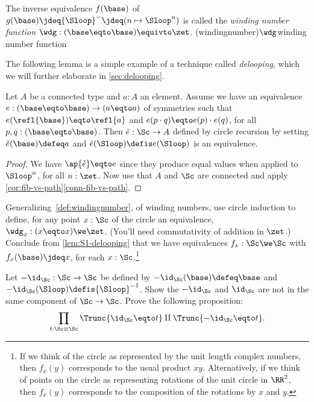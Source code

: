 \begin{definition}\label{def:windingnumber}
The inverse equivalence $f(\base)$ of $g(\base)\jdeq{\Sloop}^{-}
\jdeq(n\mapsto \Sloop^n)$ is called the \emph{winding number function}
  $\wdg : (\base \eqto\base) \equivto \zet$.
  \glossary(windingnumber){$\protect\wdg$}{winding number function}
\end{definition}
The following lemma is a simple example of a technique called
\emph{delooping}, which we will further elaborate in \cref{sec:delooping}.
\begin{lemma}\label{lem:S1-delooping}
Let $A$ be a connected type and $a:A$ an element.
Assume we have an equivalence $e:(\base\eqto\base) \to (a\eqto a)$
of symmetries such that $e(\refl{\base})\eqto\refl{a}$
and $e(p\cdot q)\eqto e(p)\cdot e(q)$, for all $p,q:(\base\eqto\base)$.
Then $\check e : \Sc\to A$ defined by circle recursion by setting
$\check e(\base)\defeq a$ and $\check e(\Sloop)\defis e(\Sloop)$
is an equivalence.
\end{lemma}
\begin{proof}
We have $\ap{\check e}\eqto e$ since they produce equal values when applied
to $\Sloop^n$, for all $n:\zet$. Now use that $A$ and $\Sc$ are connected and
apply \cref{cor:fib-vs-path}\ref{conn-fib-vs-path}.
\end{proof}

\begin{xca}\label{xca:general-winding}
  Generalizing~\cref{def:windingnumber}, of winding numbers, use
  circle induction to define, for any point $x:\Sc$ of the circle an
  equivalence, $\wdg_x : (x \eqto x) \we \zet$.  (You'll need
  commutativity of addition in $\zet$.)  Conclude from
  \cref{lem:S1-delooping} that we have equivalences
  $f_x : \Sc \we \Sc$ with $f_x(\base) \jdeq x$, for each
  $x:\Sc$.\footnote{%
    If we think of the circle as represented by the unit length
    complex numbers, then $f_x(y)$ corresponds to the usual product
    $xy$.  Alternatively, if we think of points on the circle as
    representing rotations of the unit circle in $\RR^2$, then $f_x(y)$
    corresponds to the composition of the rotations by $x$ and $y$.}
\end{xca}

\begin{xca}\label{xca:S1=S1-components}
Let $-\id_\Sc : \Sc\to\Sc$ be defined by $-\id_\Sc(\base)\defeq\base$
and $-\id_\Sc(\Sloop)\defis{\Sloop}^{-1}$. Show the $-\id_\Sc$
and $\id_\Sc$ are not in the same component of $\Sc\to\Sc$.
Prove the following proposition:
\[
\prod_{t:\Sc\equiv\Sc}{\Trunc{\id_\Sc\eqto t}\amalg \Trunc{-\id_\Sc\eqto t}}.\qedhere
\]
\end{xca}

